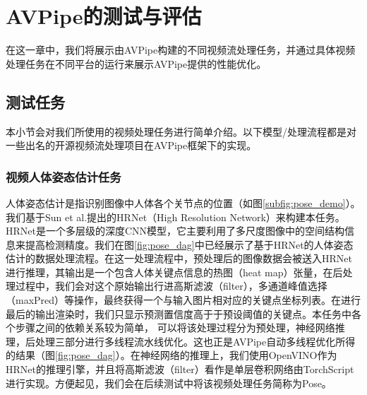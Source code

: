 
\chapter{AVPipe的测试与评估}

在这一章中，我们将展示由AVPipe构建的不同视频流处理任务，并通过具体视频处理任务在不同平台的运行来展示AVPipe提供的性能优化。

\section{测试任务}
本小节会对我们所使用的视频处理任务进行简单介绍。以下模型/处理流程都是对一些出名的开源视频流处理项目在AVPipe框架下的实现。

\subsection{视频人体姿态估计任务}
人体姿态估计是指识别图像中人体各个关节点的位置（如图\ref{subfig:pose_demo}）。我们基于Sun et al.提出的HRNet（High Resolution Network）\cite{sun2019deep}来构建本任务。HRNet是一个多层级的深度CNN模型，它主要利用了多尺度图像中的空间结构信息来提高检测精度。我们在图\ref{fig:pose_dag}中已经展示了基于HRNet的人体姿态估计的数据处理流程。在这一处理流程中，预处理后的图像数据会被送入HRNet进行推理，其输出是一个包含人体关键点信息的热图（heat map）张量，在后处理过程中，我们会对这个原始输出行进高斯滤波（filter），多通道峰值选择（maxPred）等操作，最终获得一个与输入图片相对应的关键点坐标列表。在进行最后的输出渲染时，我们只显示预测置信度高于于预设阈值的关键点。本任务中各个步骤之间的依赖关系较为简单，
可以将该处理过程分为预处理，神经网络推理，后处理三部分进行多线程流水线优化。这也正是AVPipe自动多线程优化所得的结果（图\ref{fig:pose_dag}）。在神经网络的推理上，我们使用OpenVINO作为HRNet的推理引擎，并且将高斯滤波（filter）看作是单层卷积网络由TorchScript进行实现。方便起见，我们会在后续测试中将该视频处理任务简称为Pose。

